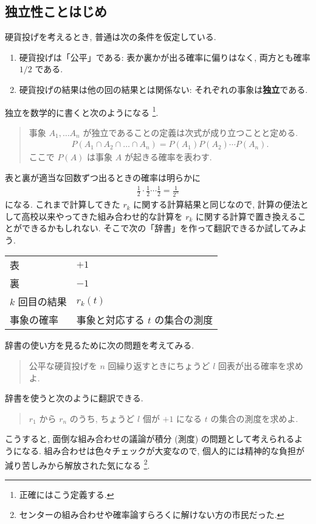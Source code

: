 \documentclass[openany, a4paper, oneside]{jsbook}
\begin{document}
\subsection{独立性ことはじめ \label{Hinashiro_math_party_1_probability_13}}

硬貨投げを考えるとき, 普通は次の条件を仮定している.
\begin{enumerate}
\item 硬貨投げは「公平」である: 表か裏かが出る確率に偏りはなく, 両方とも確率 $1/2$ である.
\item 硬貨投げの結果は他の回の結果とは関係ない: それぞれの事象は\textbf{独立}である.
\end{enumerate}
独立を数学的に書くと次のようになる \footnote{正確にはこう定義する.}.
\begin{quote}
事象 $A_1, \dots A_n$ が独立であることの定義は次式が成り立つことと定める.
\begin{align}
 P (A_1 \cap A_2 \cap \dots \cap A_n)
 =
 P (A_1) P (A_2) \cdots P (A_n).
\end{align}
ここで $P (A)$ は事象 $A$ が起きる確率を表わす.
\end{quote}

表と裏が適当な回数ずつ出るときの確率は明らかに
\begin{align}
 \frac{1}{2} \cdot \frac{1}{2} \cdots \frac{1}{2}
 =
 \frac{1}{2^n}
\end{align}
になる.
これまで計算してきた $r_k$ に関する計算結果と同じなので,
計算の便法として高校以来やってきた組み合わせ的な計算を $r_k$ に関する計算で置き換えることができるかもしれない.
そこで次の「辞書」を作って翻訳できるか試してみよう.
\begin{center}
\begin{tabular}{ll}
表 & $+1$\\
裏 & $-1$\\
$k$ 回目の結果 & $r_k (t)$\\
事象の確率 & 事象と対応する $t$ の集合の測度\\
\end{tabular}
\end{center}
辞書の使い方を見るために次の問題を考えてみる.
\begin{quote}
公平な硬貨投げを $n$ 回繰り返すときにちょうど $l$ 回表が出る確率を求めよ.
\end{quote}
辞書を使うと次のように翻訳できる.
\begin{quote}
$r_1$ から $r_n$ のうち, ちょうど $l$ 個が $+1$ になる $t$ の集合の測度を求めよ.
\end{quote}
こうすると, 面倒な組み合わせの議論が積分 (測度) の問題として考えられるようになる.
組み合わせは色々チェックが大変なので, 個人的には精神的な負担が減り苦しみから解放された気になる \footnote{センターの組み合わせや確率論すらろくに解けない方の市民だった.}.
\end{document}
